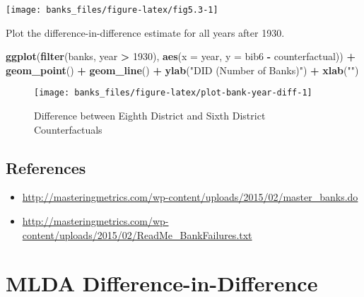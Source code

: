 \documentclass[]{book}
\newenvironment{Shaded}{\begin{snugshade}}{\end{snugshade}}
\newcommand{\DataTypeTok}[1]{\textcolor[rgb]{0.13,0.29,0.53}{#1}}
\newcommand{\DecValTok}[1]{\textcolor[rgb]{0.00,0.00,0.81}{#1}}
\newcommand{\KeywordTok}[1]{\textcolor[rgb]{0.13,0.29,0.53}{\textbf{#1}}}
\newcommand{\NormalTok}[1]{#1}
\newcommand{\OperatorTok}[1]{\textcolor[rgb]{0.81,0.36,0.00}{\textbf{#1}}}
\newcommand{\StringTok}[1]{\textcolor[rgb]{0.31,0.60,0.02}{#1}}
\providecommand{\tightlist}{%
  \setlength{\itemsep}{0pt}\setlength{\parskip}{0pt}}
\theoremstyle{definition}
\theoremstyle{definition}
\theoremstyle{definition}
\theoremstyle{remark}
\begin{document}
\begin{center}\texttt{[image: banks\_files/figure-latex/fig5.3-1]} \end{center}

Plot the difference-in-difference estimate for all years after 1930.

\begin{Shaded}
\begin{Highlighting}[]
\KeywordTok{ggplot}\NormalTok{(}\KeywordTok{filter}\NormalTok{(banks, year }\OperatorTok{>}\StringTok{ }\DecValTok{1930}\NormalTok{), }\KeywordTok{aes}\NormalTok{(}\DataTypeTok{x =}\NormalTok{ year, }\DataTypeTok{y =}\NormalTok{ bib6 }\OperatorTok{-}\StringTok{ }\NormalTok{counterfactual)) }\OperatorTok{+}
\StringTok{  }\KeywordTok{geom_point}\NormalTok{() }\OperatorTok{+}
\StringTok{  }\KeywordTok{geom_line}\NormalTok{() }\OperatorTok{+}
\StringTok{  }\KeywordTok{ylab}\NormalTok{(}\StringTok{"DID (Number of Banks)"}\NormalTok{) }\OperatorTok{+}
\StringTok{  }\KeywordTok{xlab}\NormalTok{(}\StringTok{""}\NormalTok{)}
\end{Highlighting}
\end{Shaded}

\begin{figure}

{\centering \texttt{[image: banks\_files/figure-latex/plot-bank-year-diff-1]} 

}

\caption{Difference between Eighth District and Sixth District Counterfactuals}\label{fig:plot-bank-year-diff}
\end{figure}

\hypertarget{references-4}{%
\section{References}\label{references-4}}

\begin{itemize}
\tightlist
\item
  \url{http://masteringmetrics.com/wp-content/uploads/2015/02/master_banks.do}
\item
  \url{http://masteringmetrics.com/wp-content/uploads/2015/02/ReadMe_BankFailures.txt}
\end{itemize}

\hypertarget{mlda-difference-in-difference}{%
\chapter{MLDA
Difference-in-Difference}\label{mlda-difference-in-difference}}
\end{document}
